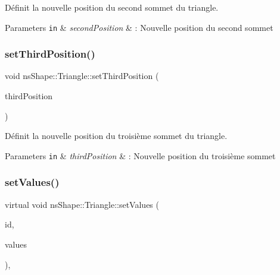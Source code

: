 Définit la nouvelle position du second sommet du triangle. 


\begin{DoxyParams}[1]{Parameters}
\mbox{\tt in}  & {\em second\+Position} & \+: Nouvelle position du second sommet \\
\hline
\end{DoxyParams}
\mbox{\label{classns_shape_1_1_triangle_a7af3264cac9e8333ec5d7315bc931047}} 
\subsubsection{\texorpdfstring{set\+Third\+Position()}{setThirdPosition()}}
{\footnotesize\ttfamily void ns\+Shape\+::\+Triangle\+::set\+Third\+Position (\begin{DoxyParamCaption}\item[{const \hyperlink{classns_graphics_1_1_vec2_d}{ns\+Graphics\+::\+Vec2D} \&}]{third\+Position }\end{DoxyParamCaption})}



Définit la nouvelle position du troisième sommet du triangle. 


\begin{DoxyParams}[1]{Parameters}
\mbox{\tt in}  & {\em third\+Position} & \+: Nouvelle position du troisième sommet \\
\hline
\end{DoxyParams}
\mbox{\label{classns_shape_1_1_triangle_af1c6cb0d5d12d8df0bd66c46ec793b22}} 
\subsubsection{\texorpdfstring{set\+Values()}{setValues()}}
{\footnotesize\ttfamily virtual void ns\+Shape\+::\+Triangle\+::set\+Values (\begin{DoxyParamCaption}\item[{const int \&}]{id,  }\item[{const std\+::vector$<$ float $>$ \&}]{values }\end{DoxyParamCaption})\hspace{0.3cm}{\ttfamily [override]}, {\ttfamily [virtual]}}



